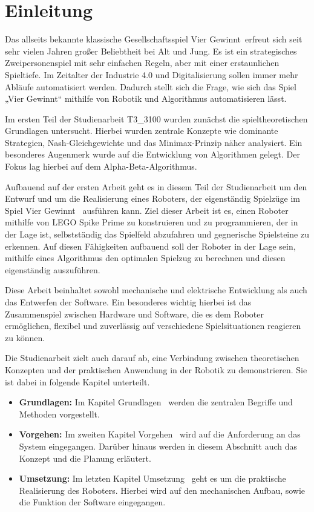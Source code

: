 \chapter{Einleitung}

Das allseits bekannte klassische Gesellschaftsspiel \glqq Vier Gewinnt\grqq~erfreut sich seit sehr vielen Jahren großer Beliebtheit bei Alt und Jung. Es ist ein strategisches Zweipersonenspiel mit sehr einfachen Regeln, aber mit einer erstaunlichen Spieltiefe. Im Zeitalter der Industrie 4.0 und Digitalisierung sollen immer mehr Abläufe automatisiert werden. Dadurch stellt sich die Frage, wie sich das Spiel „Vier Gewinnt“ mithilfe von Robotik und Algorithmus automatisieren lässt.    

Im ersten Teil der Studienarbeit T3\_3100 wurden zunächst die spieltheoretischen Grundlagen untersucht. Hierbei wurden zentrale Konzepte wie dominante Strategien, Nash-Gleichgewichte und das Minimax-Prinzip näher analysiert. Ein besonderes Augenmerk wurde auf die Entwicklung von Algorithmen gelegt. Der Fokus lag hierbei auf dem Alpha-Beta-Algorithmus.

Aufbauend auf der ersten Arbeit geht es in diesem Teil der Studienarbeit um den Entwurf und um die Realisierung eines Roboters, der eigenständig Spielzüge im Spiel \glqq Vier Gewinnt\grqq~ ausführen kann. Ziel dieser Arbeit ist es, einen Roboter mithilfe von LEGO Spike Prime zu konstruieren und zu programmieren, der in der Lage ist, selbstständig das Spielfeld abzufahren und gegnerische Spielsteine zu erkennen. Auf diesen Fähigkeiten aufbauend soll der Roboter in der Lage sein, mithilfe eines Algorithmus den optimalen Spielzug zu berechnen und diesen eigenständig auszuführen.

Diese Arbeit beinhaltet sowohl mechanische und elektrische Entwicklung als auch das Entwerfen der Software. Ein besonderes wichtig hierbei ist das Zusammenspiel zwischen Hardware und Software, die es dem Roboter ermöglichen, flexibel und zuverlässig auf verschiedene Spielsituationen reagieren zu können.

Die Studienarbeit zielt auch darauf ab, eine Verbindung zwischen theoretischen Konzepten und der praktischen Anwendung in der Robotik zu demonstrieren. Sie ist dabei in folgende Kapitel unterteilt.

\begin{itemize}
	\item \textbf{Grundlagen:} Im Kapitel \glqq Grundlagen\grqq~ werden die zentralen Begriffe und Methoden vorgestellt.
	\item \textbf{Vorgehen:} Im zweiten Kapitel \glqq Vorgehen\grqq~ wird auf die Anforderung an das System eingegangen. Darüber hinaus werden in diesem Abschnitt auch das Konzept und die Planung erläutert.
	\item \textbf{Umsetzung:} Im letzten Kapitel \glqq Umsetzung\grqq~ geht es um die praktische Realisierung des Roboters. Hierbei wird auf den mechanischen Aufbau, sowie die Funktion der Software eingegangen. 
\end{itemize}